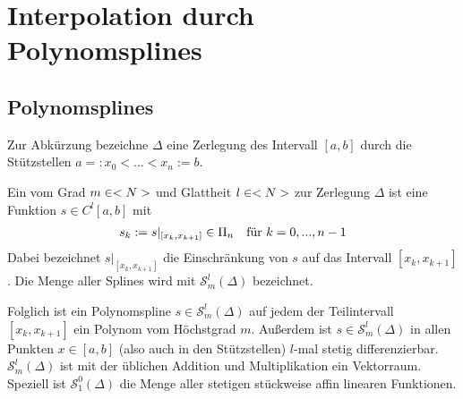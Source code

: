 \section{Interpolation durch Polynomsplines}

\subsection{Polynomsplines}

Zur Abkürzung bezeichne $\Delta$ eine Zerlegung des Intervall $[a,b]$ durch die Stützstellen $a=:x_0<...<x_n:=b$.

\begin{definition}[Polynomspline]
	Ein  vom Grad $m\in<N>$ und Glattheit $l\in<N>$ zur Zerlegung $\Delta$ ist eine Funktion $s\in C^l[a,b]$ mit
	\begin{align}
		s_k := s\vert_{[x_k,x_{k+1}]}\in\Pi_n\quad\text{für } k=0,...,n-1\notag
	\end{align}
	Dabei bezeichnet $s\vert_{[x_k,x_{k+1}]}$ die Einschränkung von $s$ auf das Intervall $[x_k,x_{k+1}]$. Die Menge aller Splines wird mit $\mathcal{S}^l_m(\Delta)$ bezeichnet.
	
	Folglich ist ein Polynomspline $s\in\mathcal{S}^l_m(\Delta)$ auf jedem der Teilintervall $[x_k,x_{k+1}]$ ein Polynom vom Höchstgrad $m$. Außerdem ist $s\in\mathcal{S}^l_m(\Delta)$ in allen Punkten $x\in[a,b]$ (also auch in den Stützstellen) $l$-mal stetig differenzierbar. $\mathcal{S}^l_m(\Delta)$ ist mit der üblichen Addition und Multiplikation ein Vektorraum. Speziell ist $\mathcal{S}^0_1(\Delta)$ die Menge aller stetigen stückweise affin linearen Funktionen.
\end{definition}

